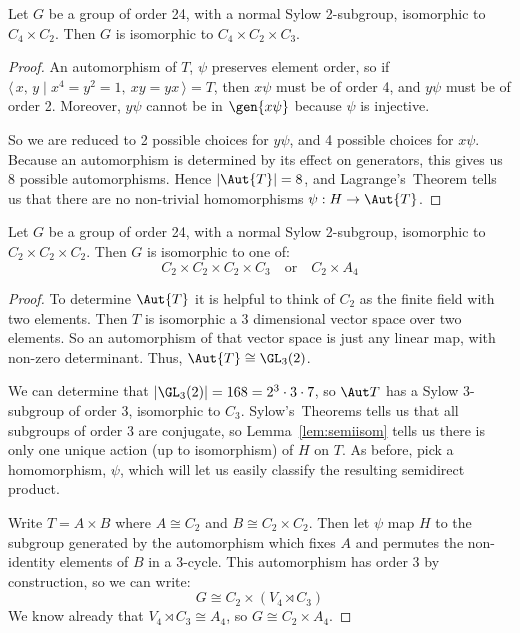 \begin{lemma}
    Let \(G\) be a group of order 24, with a normal Sylow 2-subgroup, isomorphic to \(C_4 \times C_{2}\).
    Then \(G\) is isomorphic to \(C_4 \times C_2 \times C_3\).
\end{lemma}

\begin{proof}
    An automorphism of \(T\), \(\psi\) preserves element order, so if \(\langle\,x,\,y \mid x^4 = y^2 = 1,\ xy =
    yx\,\rangle = T\), then \(x\psi\) must be of order 4, and \(y\psi\) must be of order 2.
    Moreover, \(y\psi\) cannot be in \(\gen{x\psi}\) because \(\psi\) is injective.

    So we are reduced to 2 possible choices for \(y\psi\), and 4 possible choices for \(x\psi\).
    Because an automorphism is determined by its effect on generators, this gives us 8 possible automorphisms.
    Hence \(|\Aut{T}| = 8\), and Lagrange's~Theorem tells us that there are no non-trivial homomorphisms \(\psi:H
    \to \Aut{T}\).
\end{proof}

\begin{lemma}
    Let \(G\) be a group of order 24, with a normal Sylow 2-subgroup, isomorphic to \(C_{2} \times C_2 \times C_{2}\).
    Then \(G\) is isomorphic to one of:
    \[
        C_2 \times C_2 \times C_2 \times C_3 \quad \text{or} \quad%
        C_2 \times A_4
    \]
\end{lemma}

\begin{proof}
    To determine \(\Aut{T}\) it is helpful to think of \(C_2\) as the finite field with two elements.
    Then \(T\) is isomorphic a 3 dimensional vector space over two elements.
    So an automorphism of that vector space is just any linear map, with non-zero determinant.
    Thus, \(\Aut{T} \cong \GL_3(2)\).

    We can determine that \(|\GL_3(2)| = 168 = 2^3 \cdot 3 \cdot 7\), so \(\Aut T\) has a Sylow 3-subgroup of order
    3, isomorphic to \(C_3\).
    Sylow's~Theorems tells us that all subgroups of order 3 are conjugate, so Lemma~\ref{lem:semiisom} tells us
    there is only one unique action (up to isomorphism) of \(H\) on \(T\).
    As before, pick a homomorphism, \(\psi\), which will let us easily classify the resulting semidirect product.

    Write \(T = A \times B\) where \(A \cong C_2\) and \(B \cong C_2 \times C_2\).
    Then let \(\psi\) map \(H\) to the subgroup generated by the automorphism which fixes \(A\) and permutes the
    non-identity elements of \(B\) in a 3-cycle.
    This automorphism has order 3 by construction, so we can write:
    \[G \cong C_2 \times (V_4 \rtimes C_3)\]
    We know already that \(V_4 \rtimes C_3 \cong A_4\), so \(G \cong C_2 \times A_4\).
\end{proof}


